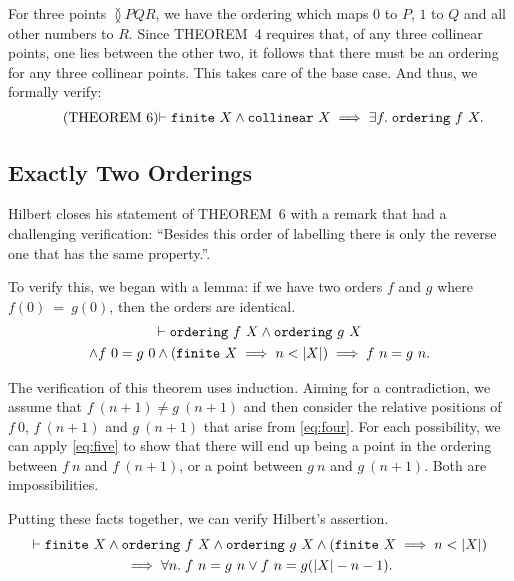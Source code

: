 For three points $\between{P}{Q}{R}$, we have the ordering which maps $0$ to $P$, $1$ to $Q$ and all other numbers to $R$. Since THEOREM~4 requires that, of any three collinear points, one lies between the other two, it follows that there must be an ordering for any three collinear points. This takes care of the base case. And thus, we formally verify:
\begin{equation}
  \label{eq:six}
  \tag{THEOREM~6}
  \begin{split}
    \vdash\texttt{finite}\ X \wedge \texttt{collinear}\ X \implies \exists f.\; \texttt{ordering}\ f\ X.
  \end{split}
\end{equation}

\subsection{Exactly Two Orderings}
Hilbert closes his statement of THEOREM~6 with a remark that had a challenging verification: ``Besides this order of labelling there is only the reverse one that has the same property.''.

To verify this, we began with a lemma: if we have two orders $f$ and $g$ where\linebreak $f(0)~=~g(0)$, then the orders are identical. 
\begin{multline*}
  \vdash\texttt{ordering}\ f\ X \wedge \texttt{ordering}\ g\ X \\\wedge f\ 0 = g\ 0
  \wedge (\texttt{finite}\ X \implies n < |X|) \implies f\ n = g\ n.
\end{multline*}

The verification of this theorem uses induction. Aiming for a contradiction, we assume that $f\ (n+1) \neq g\ (n+1)$ and then consider the relative positions of $f\ 0$, \mbox{$f\ (n+1)$} and $g\ (n+1)$ that arise from \ref{eq:four}. For each possibility, we can apply \ref{eq:five} to show that there will end up being a point in the ordering between $f\ n$ and $f\ (n+1)$, or a point between $g\ n$ and $g\ (n+1)$. Both are impossibilities.

Putting these facts together, we can verify Hilbert's assertion.
\begin{multline*}
  \vdash\texttt{finite}\ X \wedge \texttt{ordering}\ f\ X \wedge \texttt{ordering}\ g\ X \wedge (\texttt{finite}\ X \implies n < |X|)\\
  \implies \forall n.\; f\ n = g\ n \vee f\ n = g (|X| - n - 1).
\end{multline*}

